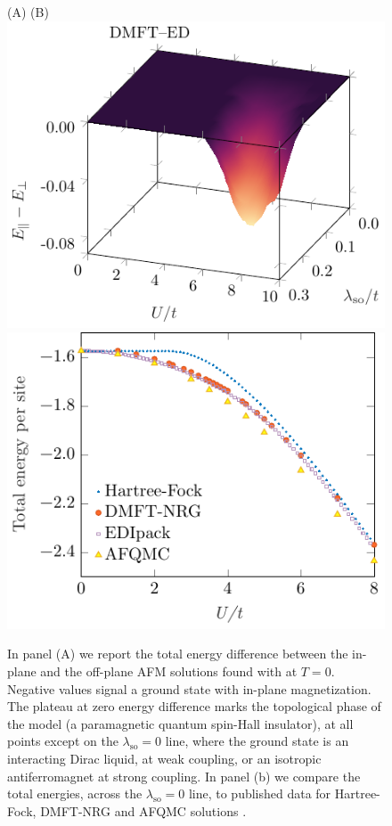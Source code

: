 \documentclass[edipack_sp.tex]{subfiles}
\begin{document}
\begin{figure}
\hspace{1cm} (A) \hspace{7.25cm} (B)\\
    \includegraphics[width=0.47\linewidth,trim={0 0 0 5mm},clip]{figures/KMH_energy.pdf}\hfill
    \includegraphics[width=0.45\linewidth]{figures/benchEnergy_honey.pdf}\\
    \caption{In panel (A) we report the total energy difference between 
    the in-plane and the
    off-plane AFM solutions found with \NAME at $T=0$. Negative values
    signal a ground state with in-plane magnetization. The plateau at zero
    energy difference marks the topological phase of the model (a 
    paramagnetic quantum spin-Hall insulator), at all points except on the $\lambda_\mathrm{so}=0$ line, where the ground state is an interacting
    Dirac liquid, at weak coupling, or an isotropic antiferromagnet at strong coupling. In panel (b) we compare the total energies, across the 
    $\lambda_\mathrm{so}=0$ line, to published data for Hartree-Fock,
    DMFT-NRG and AFQMC solutions \cite{Racz2020}.}
    \label{fig:KMenergy}
\end{figure}
\end{document}
